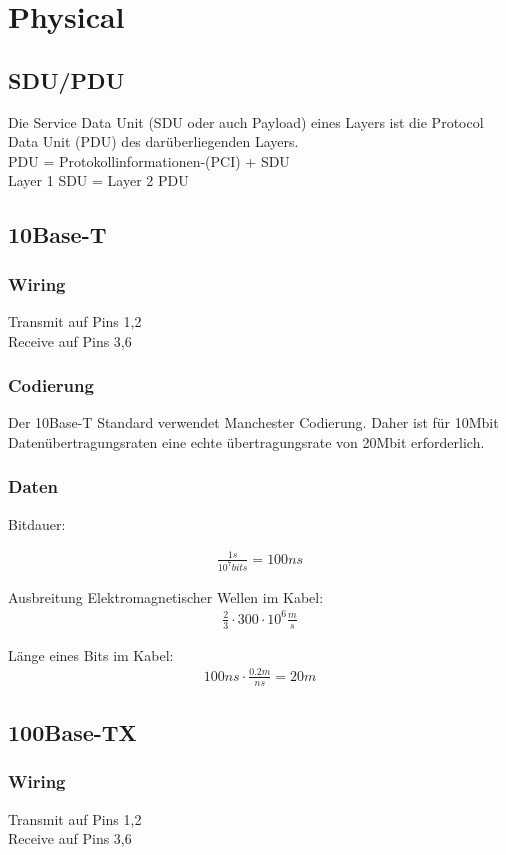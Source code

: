 \section{Physical}
\subsection{SDU/PDU}
Die Service Data Unit (SDU oder auch Payload) eines Layers ist die Protocol Data Unit (PDU) des darüberliegenden Layers. \\
PDU = Protokollinformationen-(PCI) + SDU\\
Layer 1 SDU = Layer 2 PDU
\subsection{10Base-T}

\subsubsection{Wiring}
Transmit auf Pins 1,2\\
Receive auf Pins 3,6

\subsubsection{Codierung}
Der 10Base-T Standard verwendet Manchester Codierung. Daher ist für 10Mbit Datenübertragungsraten eine echte übertragungsrate von 20Mbit erforderlich.
\subsubsection{Daten}

Bitdauer:

\begin{align}
\frac{1s}{10^{7}bits} = 100ns
\end{align}


Ausbreitung Elektromagnetischer Wellen im Kabel: 
\begin{align}
\frac{2}{3} \cdot 300\cdot 10^{6} \frac{m}{s}
\end{align}

Länge eines Bits im Kabel:
\begin{align}
100ns \cdot \frac{0.2m}{ns} = 20m
\end{align}

\subsection{100Base-TX}
\subsubsection{Wiring}
Transmit auf Pins 1,2\\
Receive auf Pins 3,6

